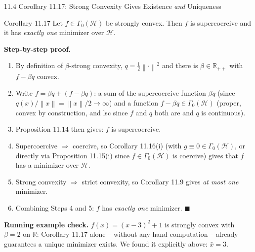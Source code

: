 \documentclass[aspectratio=169,10pt]{beamer}
\newcommand{\mHH}{\mathcal H}
\newcommand{\norm}[1]{\left\|#1\right\|}
\newcommand{\R}{\mathbb{R}}
\newcommand{\Rpp}{\mathbb{R}_{++}}
\newcommand{\GamZero}{\Gamma_0(\mHH)}
\begin{document}
\begin{frame}{11.4 Corollary 11.17: Strong Convexity Gives Existence \emph{and} Uniqueness}

  \begin{alertblock}{Corollary 11.17}
    Let $f\in\GamZero$ be strongly convex. Then $f$ is supercoercive
    and it has \emph{exactly one} minimizer over $\mHH$.
  \end{alertblock}

  \textbf{Step-by-step proof.}
  \begin{enumerate}
    \item By definition of $\beta$-strong convexity, $q=\tfrac12\norm{\cdot}^2$
          and there is $\beta\in\Rpp$ with $f-\beta q$ convex.
    \item Write $f=\beta q+(f-\beta q)$: a sum of the supercoercive
          function $\beta q$ (since $q(x)/\norm{x}=\norm{x}/2\to\infty$)
          and a function $f-\beta q\in\GamZero$ (proper, convex by
          construction, and lsc since $f$ and $q$ both are and $q$ is
          continuous).
    \item Proposition 11.14 then gives: $f$ is supercoercive.
    \item Supercoercive $\Rightarrow$ coercive, so Corollary 11.16(i)
          (with $g\equiv0\in\GamZero$, or directly via Proposition
          11.15(i) since $f\in\GamZero$ is coercive) gives that $f$
          has a minimizer over $\mHH$.
    \item Strong convexity $\Rightarrow$ strict convexity, so
          Corollary 11.9 gives \emph{at most one} minimizer.
    \item Combining Steps 4 and 5: $f$ has \emph{exactly one}
          minimizer. \hfill$\blacksquare$
  \end{enumerate}

  \textbf{Running example check.} $f(x)=(x-3)^2+1$ is strongly
  convex with $\beta=2$ on $\R$: Corollary 11.17 alone -- without any
  hand computation -- already guarantees a unique minimizer exists.
  We found it explicitly above: $\bar x=3$.

\end{frame}
\end{document}
